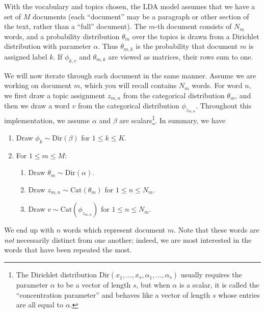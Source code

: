 With the vocabulary and topics chosen, the LDA model assumes that we have a set of $M$ documents (each ``document'' may be a paragraph or other section of the text, rather than a ``full'' document).
The $m$-th document consists of $N_m$ words, and a probability distribution $\theta_{m}$ over the topics is drawn from a Dirichlet distribution with parameter $\alpha$.
Thus $\theta_{m,k}$ is the probability that document $m$ is assigned label $k$.
If $\phi_{k,v}$ and $\theta_{m,k}$ are viewed as matrices, their rows sum to one.


We will now iterate through each document in the same manner.
Assume we are working on document $m$, which you will recall contains $N_{m}$ words.
For word $n$, we first draw a topic assignment $z_{m,n}$ from the categorical distribution $\theta_{m}$, and then we draw a word $v$ from the categorical distribution $\phi_{z_{m,n}}$.
Throughout this implementation, we assume $\alpha$ and $\beta$ are scalars\footnote{The Dirichlet distribution Dir$(x^{}_{1},...,x^{}_s,\alpha^{}_{1},...,\alpha^{}_s)$ usually requires the parameter $\alpha$ to be a vector of length $s$, but when $\alpha$ is a scalar, it is called the ``concentration parameter'' and behaves like a vector of length $s$ whose entries are all equal to $\alpha$.}.
In summary, we have
\begin{enumerate}
    \item Draw $\phi_{k} \sim \text{Dir}(\beta)$ for $1 \leq k \leq K$.
    \item For $1 \leq m \leq M$:
    \begin{enumerate}
        \item Draw $\theta_{m} \sim \text{Dir}(\alpha)$.
        \item Draw $z_{m,n} \sim \text{Cat}(\theta_{m})$ for $1 \leq n \leq N_{m}$.
        \item Draw $v \sim \text{Cat}(\phi_{z_{m,n}})$ for $1 \leq n \leq N_{m}$.
    \end{enumerate}
\end{enumerate}

We end up with $n$ words which represent document $m$.
Note that these words are \emph{not} necessarily distinct from one another; indeed, we are most interested in the words that have been repeated the most.

